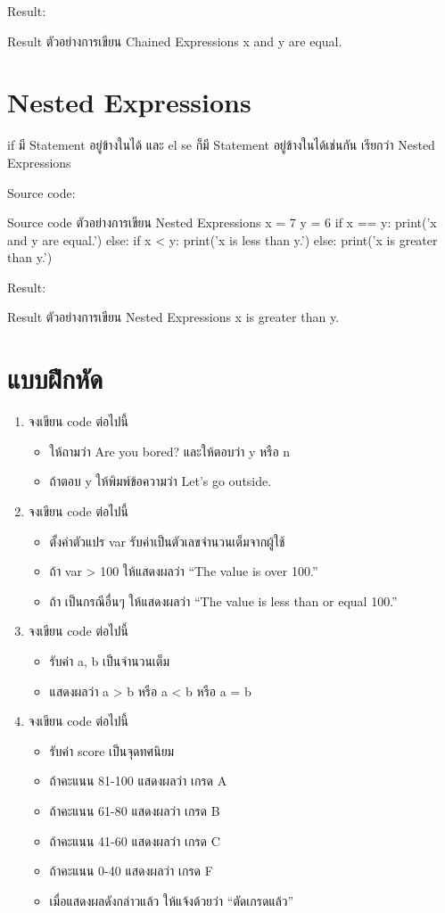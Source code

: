 Result:
\begin{codelist}{Result ตัวอย่างการเขียน Chained Expressions}{}
x and y are equal.
\end{codelist}


\section{Nested Expressions}

if มี Statement อยู่ข้างในได้ และ el se ก็มี Statement อยู่ข้างในได้เช่นกัน เรียกว่า Nested Expressions

Source code:
\begin{codelist}{Source code ตัวอย่างการเขียน Nested Expressions}{}
x = 7
y = 6
if x == y: print('x and y are equal.')
else:
    if x < y: print('x is less than y.')
    else: print('x is greater than y.')
\end{codelist}

Result:
\begin{codelist}{Result  ตัวอย่างการเขียน Nested Expressions}{}
x is greater than y.
\end{codelist}

\section{แบบฝึกหัด}

\begin{enumerate} 
\item  จงเขียน code ต่อไปนี้
\begin{itemize}
\item ให้ถามว่า Are you bored? และให้ตอบว่า y หรือ n
\item ถ้าตอบ y ให้พิมพ์ข้อความว่า Let’s go outside.
\end{itemize}
\item จงเขียน code ต่อไปนี้
\begin{itemize}
\item ตั้งค่าตัวแปร var รับค่าเป็นตัวเลขจำนวนเต็มจากผู้ใช้
\item ถ้า var > 100 ให้แสดงผลว่า “The value is over 100.”
\item ถ้า เป็นกรณีอื่นๆ ให้แสดงผลว่า “The value is less than or equal 100.”
\end{itemize}
\item จงเขียน code ต่อไปนี้
\begin{itemize}
\item รับค่า a, b เป็นจำนวนเต็ม
\item แสดงผลว่า a > b หรือ a < b หรือ a = b
\end{itemize}
\item จงเขียน code ต่อไปนี้
\begin{itemize}
\item รับค่า score เป็นจุดทศนิยม
\item ถ้าคะแนน 81-100 แสดงผลว่า เกรด A
\item ถ้าคะแนน 61-80  แสดงผลว่า เกรด B
\item ถ้าคะแนน 41-60 แสดงผลว่า เกรด C
\item ถ้าคะแนน 0-40 แสดงผลว่า เกรด F
\item เมื่อแสดงผลดังกล่าวแล้ว ให้แจ้งด้วยว่า “ตัดเกรดแล้ว”
\end{itemize}
\end{enumerate}
